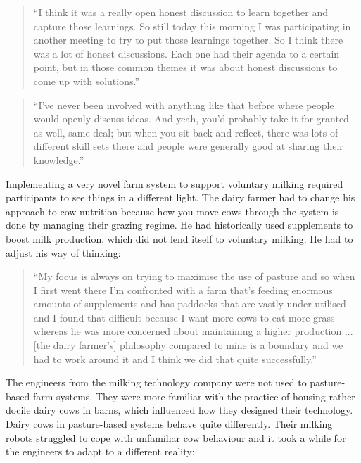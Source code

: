 \begin{quote}
\small
\enquote{I think it was a really open honest discussion to learn together and capture those learnings. So still today this morning I was participating in another meeting to try to put those learnings together. So I think there was a lot of honest discussions. Each one had their agenda to a certain point, but in those common themes it was about honest discussions to come up with solutions.} \\
\end{quote}

\begin{quote}
\small
\enquote{I've never been involved with anything like that before where people would openly discuss ideas. And yeah, you'd probably take it for granted as well, same deal; but when you sit back and reflect, there was lots of different skill sets there and people were generally good at sharing their knowledge.} \\
\end{quote}

Implementing a very novel farm system to support voluntary milking required participants to see things in a different light. The dairy farmer had to change his approach to cow nutrition because how you move cows through the system is done by managing their grazing regime. He had historically used supplements to boost milk production, which did not lend itself to voluntary milking. He had to adjust his way of thinking:

\begin{quote}
\small
\enquote{My focus is always on trying to maximise the use of pasture and so when I first went there I'm confronted with a farm that's feeding enormous amounts of supplements and has paddocks that are vastly under-utilised and I found that difficult because I want more cows to eat more grass whereas he was more concerned about maintaining a higher production ... [the dairy farmer's] philosophy compared to mine is a boundary and we had to work around it and I think we did that quite successfully.} \\
\end{quote}

The engineers from the milking technology company were not used to pasture-based farm systems. They were more familiar with the practice of housing rather docile dairy cows in barns, which influenced how they designed their technology. Dairy cows in pasture-based systems behave quite differently. Their milking robots struggled to cope with unfamiliar cow behaviour and it took a while for the engineers to adapt to a different reality:

